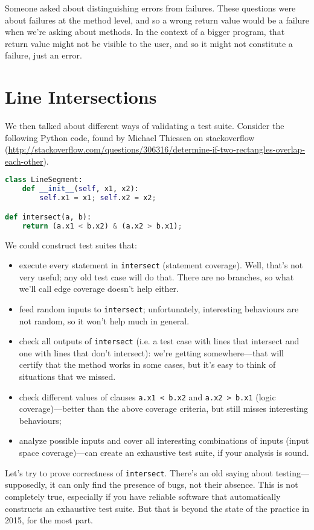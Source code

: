 \documentclass[11pt]{article}
\begin{document}
Someone asked about distinguishing errors from failures. These
questions were about failures at the method level, and so a wrong
return value would be a failure when we're asking about methods. In
the context of a bigger program, that return value might not be
visible to the user, and so it might not constitute a failure, just an
error.

\section*{Line Intersections}
We then talked about different ways of validating a test suite.
Consider the following Python code, found by Michael Thiessen
on stackoverflow (\url{http://stackoverflow.com/questions/306316/determine-if-two-rectangles-overlap-each-other}).

\begin{lstlisting}[language=python]
class LineSegment:
    def __init__(self, x1, x2):
        self.x1 = x1; self.x2 = x2;

def intersect(a, b):
    return (a.x1 < b.x2) & (a.x2 > b.x1);
\end{lstlisting}

We could construct test suites that:
\begin{itemize}
\item execute every statement in {\tt intersect} (statement coverage). Well, that's not very useful; any old test case
  will do that. There are no branches, so what we'll call edge coverage
  doesn't help either.
\item feed random inputs to {\tt intersect}; unfortunately,
  interesting behaviours are not random, so it won't help much
  in general.
\item check all outputs of {\tt intersect} (i.e. a test case with
  lines that intersect and one with lines that don't intersect): we're
  getting somewhere---that will certify that the method works in some
  cases, but it's easy to think of situations that we missed.
\item check different values of clauses {\tt a.x1 < b.x2} and {\tt a.x2 > b.x1} (logic coverage)---better than the above coverage criteria, but still misses interesting behaviours;
  \item analyze possible inputs and cover all interesting combinations of inputs (input space coverage)---can create an exhaustive test suite, if your analysis is sound.
\end{itemize}

Let's try to prove correctness of {\tt intersect}. There's an old
saying about testing---supposedly, it can only find the presence of
bugs, not their absence. This is not completely true, especially if
you have reliable software that automatically constructs an exhaustive
test suite.  But that is beyond the state of the practice in 2015, for
the most part.
\end{document}
